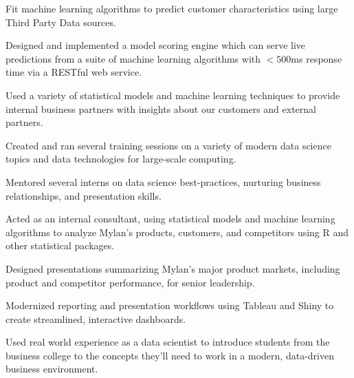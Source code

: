 \documentclass[letterpaper]{deedy-resume} %
\begin{document}
\begin{minipage}[t]{0.65\textwidth}
\hfill
{}
\begin{tightitemize}
\item Fit machine learning algorithms to predict customer characteristics using
  large Third Party Data sources.
\item Designed and implemented a model scoring engine which 
  can serve live predictions from a suite of machine learning algorithms with
  $<500$ms response time via a RESTful web service.
\item Used a variety of statistical models and machine learning techniques to
  provide internal business partners with insights about our customers and
  external partners.
\item Created and ran several training sessions on a variety of modern data
  science topics and data technologies for large-scale computing.
\item Mentored several interns on data science best-practices, nurturing
  business relationships, and presentation skills.
\end{tightitemize}
\sectionspace



\hfill{}
\hfill{}
\begin{tightitemize}
\item Acted as an internal consultant, using statistical models and machine
  learning algorithms to 
  analyze Mylan's products, customers, and competitors using R and
  other statistical packages.
\item Designed presentations summarizing Mylan's major product markets,
  including product and competitor performance, for senior leadership.
\item Modernized reporting and presentation workflows using Tableau and
  Shiny to create streamlined, interactive dashboards.
\end{tightitemize}
\sectionspace %


\hfill{}
\hfill
{}
\begin{tightitemize}
\item Used real world experience as a data scientist to introduce
  students from the business college to the concepts they'll need to
  work in a modern, data-driven  business environment.
\end{tightitemize}
\sectionspace %


\end{minipage}
\end{document}
